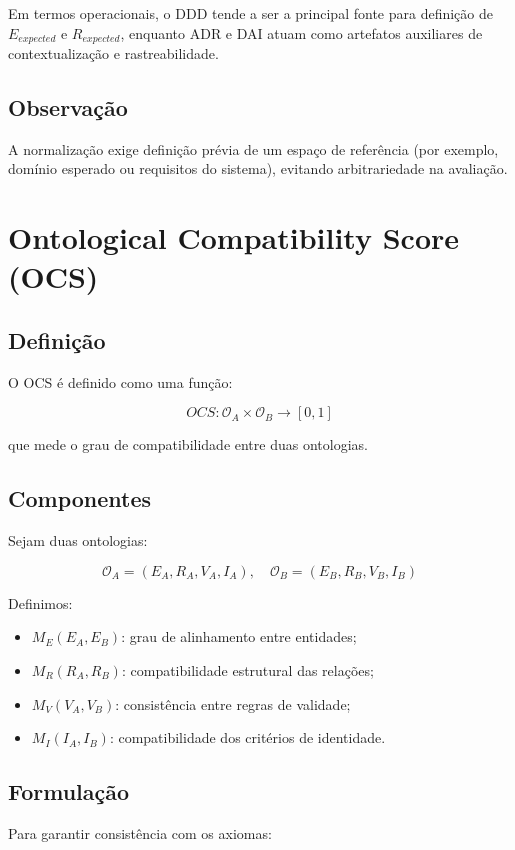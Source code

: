 \documentclass[12pt,a4paper]{article}
\begin{document}
Em termos operacionais, o DDD tende a ser a principal fonte para definição de \(E_{expected}\) e \(R_{expected}\), enquanto ADR e DAI atuam como artefatos auxiliares de contextualização e rastreabilidade.

\subsection{Observação}

A normalização exige definição prévia de um espaço de referência (por exemplo, domínio esperado ou requisitos do sistema), evitando arbitrariedade na avaliação.

\section{Ontological Compatibility Score (OCS)}

\subsection{Definição}

O OCS é definido como uma função:

\[
OCS : \mathcal{O}_A \times \mathcal{O}_B \rightarrow [0,1]
\]

que mede o grau de compatibilidade entre duas ontologias.

\subsection{Componentes}

Sejam duas ontologias:

\[
\mathcal{O}_A = (E_A, R_A, V_A, I_A), \quad
\mathcal{O}_B = (E_B, R_B, V_B, I_B)
\]

Definimos:

\begin{itemize}
	\item \(M_E(E_A, E_B)\): grau de alinhamento entre entidades;
	\item \(M_R(R_A, R_B)\): compatibilidade estrutural das relações;
	\item \(M_V(V_A, V_B)\): consistência entre regras de validade;
	\item \(M_I(I_A, I_B)\): compatibilidade dos critérios de identidade.
\end{itemize}

\subsection{Formulação}
Para garantir consistência com os axiomas:
\end{document}
